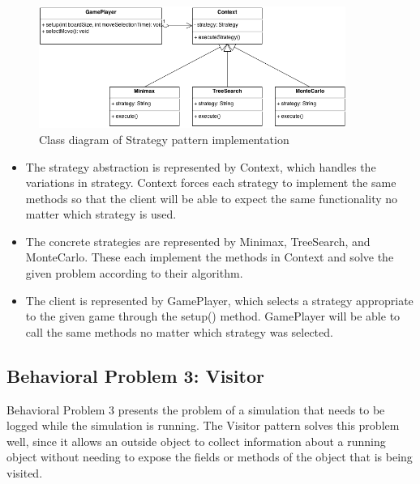 \documentclass[12pt]{article}
\begin{document}
\begin{figure}[!htb]
  \begin{center}
    \includegraphics[width=100mm]{Strategy.png}
    \caption{Class diagram of Strategy pattern implementation}
    \label{fig:strategy}
  \end{center} 
\end{figure}

\begin{itemize}
\item The strategy abstraction is represented by {\ttfamily Context}, which 
  handles the variations in strategy. {\ttfamily Context} forces each strategy
  to implement the same methods so that the client will be able to expect the
  same functionality no matter which strategy is used.
\item The concrete strategies are represented by {\ttfamily Minimax}, 
  {\ttfamily TreeSearch}, and {\ttfamily MonteCarlo}. These each implement the
  methods in {\ttfamily Context} and solve the given problem according to their
  algorithm.
\item The client is represented by {\ttfamily GamePlayer}, which selects a 
  strategy appropriate to the given game through the {\ttfamily setup()} method. 
  {\ttfamily GamePlayer} will be able to call the same methods no matter which 
  strategy was selected.
\end{itemize}

\newpage
\subsection{Behavioral Problem 3: Visitor}

Behavioral Problem 3 presents the problem of a simulation that needs to be 
logged while the simulation is running. The Visitor pattern solves this problem
well, since it allows an outside object to collect information about a running
object without needing to expose the fields or methods of the object that is 
being visited.
\end{document}
